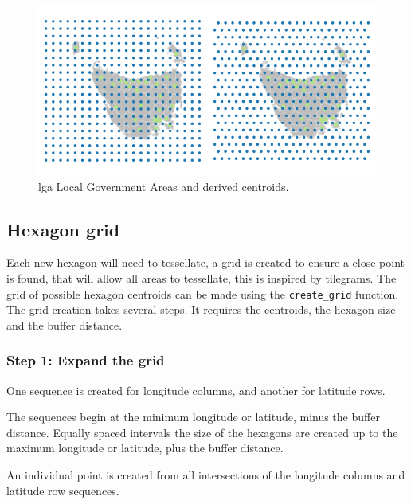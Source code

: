\begin{Schunk}
\begin{figure}
\includegraphics{algorithmRjournal_files/figure-latex/unnamed-chunk-3-1} \caption[lga Local Government Areas and derived centroids]{lga Local Government Areas and derived centroids.}\label{fig:unnamed-chunk-3}
\end{figure}
\end{Schunk}

\hypertarget{hexagon-grid}{%
\subsection{Hexagon grid}\label{hexagon-grid}}

Each new hexagon will need to tessellate, a grid is created to ensure a
close point is found, that will allow all areas to tessellate, this is
inspired by tilegrams. The grid of possible hexagon centroids can be
made using the \texttt{create\_grid} function. The grid creation takes
several steps. It requires the centroids, the hexagon size and the
buffer distance.

\hypertarget{step-1-expand-the-grid}{%
\subsubsection{Step 1: Expand the grid}\label{step-1-expand-the-grid}}

One sequence is created for longitude columns, and another for latitude
rows.

The sequences begin at the minimum longitude or latitude, minus the
buffer distance. Equally spaced intervals the size of the hexagons are
created up to the maximum longitude or latitude, plus the buffer
distance.

An individual point is created from all intersections of the longitude
columns and latitude row sequences.

